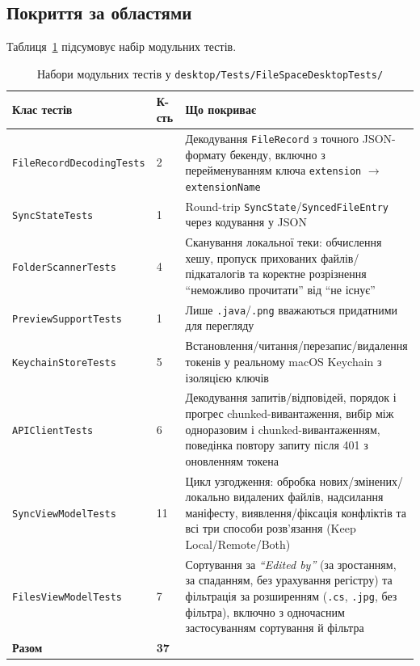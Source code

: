 \documentclass[12pt,a4paper]{article}
\begin{document}
\subsection{Покриття за областями}

Таблиця~\ref{tab:tests} підсумовує набір модульних тестів.

\small
\begin{longtable}{@{}p{4.8cm}p{1.2cm}p{9.2cm}@{}}
\caption{Набори модульних тестів у \texttt{desktop/Tests/\allowbreak FileSpaceDesktopTests/}}
\label{tab:tests} \\
\toprule
\textbf{Клас тестів} & \textbf{К-сть} & \textbf{Що покриває} \\
\midrule
\endhead
\texttt{FileRecord\-Decoding\-Tests} & 2 & Декодування \texttt{FileRecord} з точного JSON-формату бекенду, включно з перейменуванням ключа \texttt{extension} $\to$ \texttt{extensionName} \\
\texttt{SyncStateTests} & 1 & Round-trip \texttt{SyncState}/\texttt{SyncedFileEntry} через кодування у JSON \\
\texttt{FolderScannerTests} & 4 & Сканування локальної теки: обчислення хешу, пропуск прихованих файлів/підкаталогів та коректне розрізнення ``неможливо прочитати'' від ``не існує'' \\
\texttt{PreviewSupportTests} & 1 & Лише \texttt{.java}/\texttt{.png} вважаються придатними для перегляду \\
\texttt{KeychainStoreTests} & 5 & Встановлення/читання/перезапис/видалення токенів у реальному macOS Keychain з ізоляцією ключів \\
\texttt{APIClientTests} & 6 & Декодування запитів/відповідей, порядок і прогрес chunked-вивантаження, вибір між одноразовим і chunked-вивантаженням, поведінка повтору запиту після 401 з оновленням токена \\
\texttt{SyncViewModelTests} & 11 & Цикл узгодження: обробка нових/змінених/локально видалених файлів, надсилання маніфесту, виявлення/фіксація конфліктів та всі три способи розв'язання (Keep Local/Remote/Both) \\
\texttt{FilesViewModelTests} & 7 & Сортування за \emph{``Edited by''} (за зростанням, за спаданням, без урахування регістру) та фільтрація за розширенням (\texttt{.cs}, \texttt{.jpg}, без фільтра), включно з одночасним застосуванням сортування й фільтра \\
\bottomrule
\textbf{Разом} & \textbf{37} & \\
\end{longtable}
\end{document}
